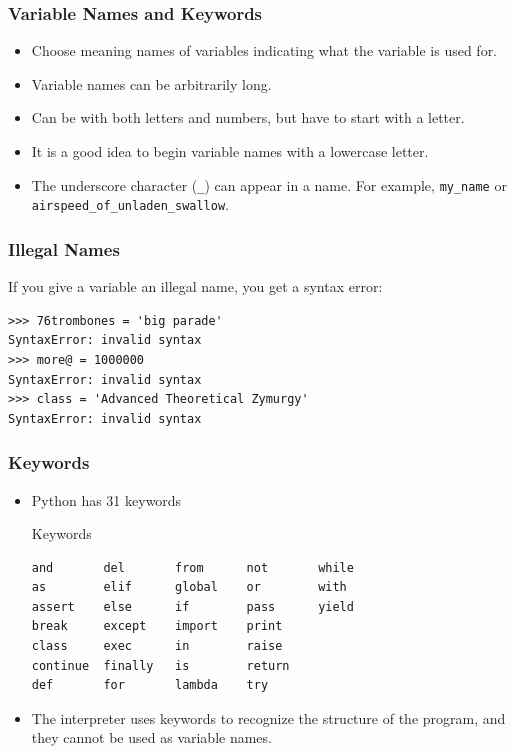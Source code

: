 \documentclass{beamer}
\begin{document}
\begin{frame}[fragile]
\frametitle{Variable Names and Keywords}
\begin{itemize}[<+->]
\item Choose meaning names of variables indicating what the variable is used for.
\item Variable names can be arbitrarily long.
\item Can be with both letters and numbers, but have to start with a letter.
\item It is a good idea to begin variable names with a  \alert{lowercase letter}.
\item The underscore character (\verb"_") can appear in a name. For example, 
\verb"my_name" or \verb"airspeed_of_unladen_swallow".
\end{itemize}
\end{frame}

\begin{frame}[fragile]\frametitle{Illegal Names}
If you give a variable an illegal name, you get a syntax error:
\begin{block}{}
\begin{verbatim}
>>> 76trombones = 'big parade'
SyntaxError: invalid syntax
>>> more@ = 1000000
SyntaxError: invalid syntax
>>> class = 'Advanced Theoretical Zymurgy'
SyntaxError: invalid syntax
\end{verbatim}
\end{block}
\end{frame}
%
\begin{frame}[fragile]
\frametitle{Keywords}
\begin{itemize}
\item
Python has 31 keywords
\begin{block}{Keywords}
\begin{verbatim}
and       del       from      not       while    
as        elif      global    or        with     
assert    else      if        pass      yield    
break     except    import    print              
class     exec      in        raise              
continue  finally   is        return             
def       for       lambda    try
\end{verbatim}
\end{block}
\item
The
interpreter uses keywords to recognize the structure of the program,
and they cannot be used as variable names.
\end{itemize}
\end{frame}
\end{document}
